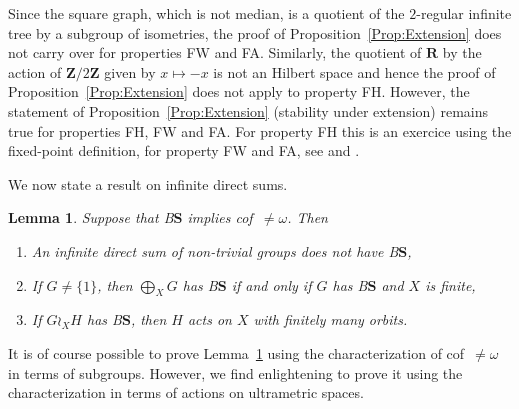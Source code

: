 \documentclass[a4paper]{article}
\newcommand{\PH}[1]{\todo[color={blue!33},size=small]{#1}}
\newtheorem{lem}{Lemma}[section]
\theoremstyle{definition}
\newcommand*{\field}[1]{\mathbf{#1}}
\newcommand*{\Z}{\field{Z}}
\newcommand*{\R}{\field{R}}
\newcommand*{\BS}{B$\mathbf{S}$}
\begin{document}
%
%
Since the square graph, which is not median, is a quotient of the $2$-regular infinite tree by a subgroup of isometries, the proof of Proposition~\ref{Prop:Extension} does not carry over for properties FW and FA.
Similarly, the quotient of $\R$ by the action of $\Z/2\Z$ given by $x\mapsto-x$ is not an Hilbert space and hence the proof of Proposition~\ref{Prop:Extension} does not apply to property FH.
However, the statement of Proposition~\ref{Prop:Extension} (stability under extension) remains true for properties FH, FW and FA.
For property FH this is an exercice using the fixed-point definition, for property FW and FA, see \cite{Cornulier2013} and \cite{MR0476875}.%

We now state a result on infinite direct sums.
%
%
\begin{lem}\label{Lemma:Cof}
Suppose that \BS{} implies cof~$\neq\omega$. Then
\begin{enumerate}
\item An infinite direct sum of non-trivial groups does not have \BS,
\item If $G\neq\{1\}$, then $\bigoplus_XG$ has \BS{} if and only if $G$ has \BS{} and $X$ is finite,
\item If $G\wr_XH$ has \BS, then $H$ acts on $X$ with finitely many orbits.
\end{enumerate}
\end{lem}
%
%
It is of course possible to prove Lemma~\ref{Lemma:Cof} using the characterization of cof~$\neq\omega$ in terms of subgroups. However, we find enlightening to prove it using the characterization in terms of actions on ultrametric spaces.
%
%
\end{document}
